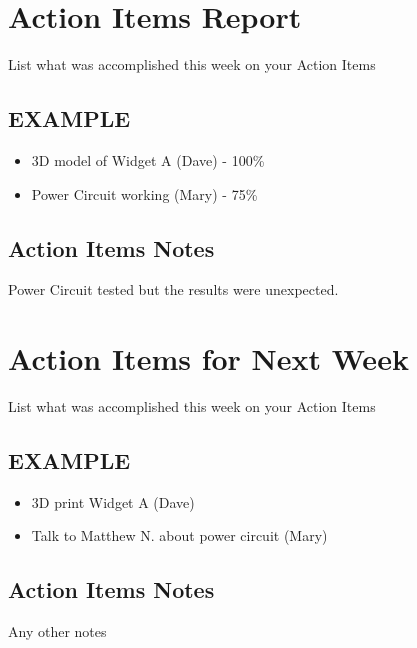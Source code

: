 \documentclass[10pt,a4paper]{article}
\begin{document}
\begin{Form}
\begin{framed}
\section*{Action Items Report}
List what was accomplished this week on your Action Items
\subsection*{EXAMPLE}
\begin{itemize}
\item 3D model of Widget A (Dave) - 100\% 
\item Power Circuit working (Mary) - 75\%
\end{itemize}

\subsection*{Action Items Notes}
Power Circuit tested but the results were unexpected.
\section*{Action Items for Next Week}
List what was accomplished this week on your Action Items
\subsection*{EXAMPLE}
\begin{itemize}
\item 3D print Widget A (Dave)
\item Talk to Matthew N. about power circuit (Mary)
\end{itemize}
\subsection*{Action Items Notes}
Any other notes

\end{framed}
\end{Form}
\end{document}
